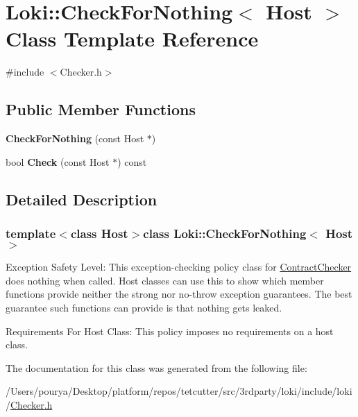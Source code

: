 \hypertarget{classLoki_1_1CheckForNothing}{}\section{Loki\+:\+:Check\+For\+Nothing$<$ Host $>$ Class Template Reference}
\label{classLoki_1_1CheckForNothing}


{\ttfamily \#include $<$Checker.\+h$>$}

\subsection*{Public Member Functions}
\begin{DoxyCompactItemize}
\item 
\hypertarget{classLoki_1_1CheckForNothing_ac4a0a7e7fd090aa4e11b067845bb981f}{}{\bfseries Check\+For\+Nothing} (const Host $\ast$)\label{classLoki_1_1CheckForNothing_ac4a0a7e7fd090aa4e11b067845bb981f}

\item 
\hypertarget{classLoki_1_1CheckForNothing_aaff8482da0ce052b494f4793b27ee4a4}{}bool {\bfseries Check} (const Host $\ast$) const \label{classLoki_1_1CheckForNothing_aaff8482da0ce052b494f4793b27ee4a4}

\end{DoxyCompactItemize}


\subsection{Detailed Description}
\subsubsection*{template$<$class Host$>$class Loki\+::\+Check\+For\+Nothing$<$ Host $>$}

\begin{DoxyParagraph}{Exception Safety Level\+:}
This exception-\/checking policy class for \hyperlink{classLoki_1_1ContractChecker}{Contract\+Checker} does nothing when called. Host classes can use this to show which member functions provide neither the strong nor no-\/throw exception guarantees. The best guarantee such functions can provide is that nothing gets leaked.
\end{DoxyParagraph}
\begin{DoxyParagraph}{Requirements For Host Class\+:}
This policy imposes no requirements on a host class. 
\end{DoxyParagraph}


The documentation for this class was generated from the following file\+:\begin{DoxyCompactItemize}
\item 
/\+Users/pourya/\+Desktop/platform/repos/tetcutter/src/3rdparty/loki/include/loki/\hyperlink{Checker_8h}{Checker.\+h}\end{DoxyCompactItemize}
